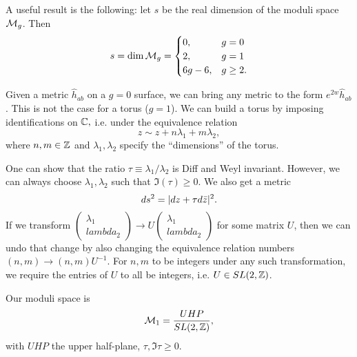 A useful result is the following: let $s$ be the real dimension of the moduli space $\mathcal{M}_g$. Then
\begin{equation}
    s=\dim \mathcal{M}_g =\begin{cases}
    0, & g=0\\
    2, & g=1\\
    6g-6, & g\geq 2.
    \end{cases}
\end{equation}

\begin{exm}
    Given a metric $\hat h_{ab}$ on a $g=0$ surface, we can bring any metric to the form $e^{2w}\hat h_{ab}$. This is not the case for a torus ($g=1$). We can build a torus by imposing identifications on $\mathbb{C},$ i.e. under the equivalence relation
    \begin{equation}
        z\sim z + n \lambda_1 + m\lambda_2,
    \end{equation}
    where $n,m\in \mathbb{Z}$ and $\lambda_1,\lambda_2$ specify the ``dimensions'' of the torus.
    
    One can show that the ratio $\tau\equiv \lambda_1/\lambda_2$ is Diff and Weyl invariant. However, we can always choose $\lambda_1,\lambda_2$ such that $\Im (\tau)\geq 0$. We also get a metric
    \begin{equation}
        ds^2=\lvert dz+\tau d\bar z\rvert^2.
    \end{equation}
    If we transform $\begin{pmatrix}\lambda_1 \\lambda_2\end{pmatrix}\to U\begin{pmatrix}\lambda_1 \\lambda_2\end{pmatrix}$ for some matrix $U$, then we can undo that change by also changing the equivalence relation numbers $(n,m)\to (n,m)U^{-1}$. For $n,m$ to be integers under any such transformation, we require the entries of $U$ to all be integers, i.e. $U\in SL(2,\mathbb{Z})$.
    
    Our moduli space is
    \begin{equation}
        \mathcal{M}_1 = \frac{UHP}{SL(2,\mathbb{Z})},
    \end{equation}
    with $UHP$ the upper half-plane, $\tau,\Im \tau \geq 0$.
\end{exm}
